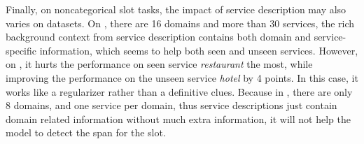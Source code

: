 Finally, on noncategorical slot tasks, the impact of service
description may also varies on datasets. On \sgdst, there are 16
domains and more than 30 services, the rich background context from
service description contains both domain and service-specific
information, which seems to help both seen and unseen
services. However, on \multiwoz, it hurts the performance on seen
service {\it restaurant} the most, while improving the performance on
the unseen service {\it hotel} by 4 points. In this case, it works
like a regularizer rather than a definitive clues. Because in
\multiwoz, there are only 8 domains, and one service per domain, thus
service descriptions just contain domain related information without
much extra information, it will not help the model to detect the span
for the slot.
%
%
%

